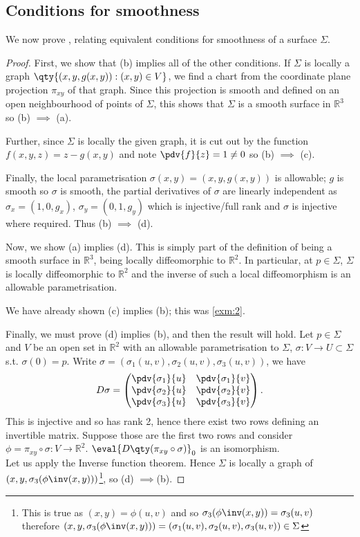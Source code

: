 \subsection{Conditions for smoothness}
We now prove , relating equivalent conditions for smoothness of a surface $\Sigma$.
\begin{proof}
	First, we show that (b) implies all of the other conditions.
	If $\Sigma$ is locally a graph $\qty{(x,y,g(x,y)) : (x, y) \in V}$, we find a chart from the coordinate plane projection $\pi_{xy}$ of that graph.
	Since this projection is smooth and defined on an open neighbourhood of points of $\Sigma$, this shows that $\Sigma$ is a smooth surface in $\mathbb R^3$ so (b) $\implies$ (a).

	Further, since $\Sigma$ is locally the given graph, it is cut out by the function $f(x,y,z) = z - g(x,y)$ and note $\pdv{f}{z} = 1 \neq 0$ so (b) $\implies$ (c).

	Finally, the local parametrisation $\sigma(x,y) = (x,y,g(x,y))$ is allowable; $g$ is smooth so $\sigma$ is smooth, the partial derivatives of $\sigma$ are linearly independent as $\sigma_x = (1, 0, g_x)$, $\sigma_y = (0, 1, g_y)$ which is injective/full rank and $\sigma$ is injective where required.
	Thus (b) $\implies$ (d).

	Now, we show (a) implies (d).
	This is simply part of the definition of being a smooth surface in $\mathbb R^3$, being locally diffeomorphic to $\mathbb R^2$.
	In particular, at $p \in \Sigma$, $\Sigma$ is locally diffeomorphic to $\mathbb R^2$ and the inverse of such a local diffeomorphism is an allowable parametrisation.

	We have already shown (c) implies (b); this was \cref{exm:2}.

	Finally, we must prove (d) implies (b), and then the result will hold.
	Let $p \in \Sigma$ and $V$ be an open set in $\mathbb R^2$ with an allowable parametrisation to $\Sigma$, $\sigma : V \to U \subset \Sigma$ s.t. $\sigma(0) = p$.
	Write $\sigma = (\sigma_1(u,v), \sigma_2(u,v), \sigma_3(u,v))$, we have
	\begin{align*}
		D\sigma = \begin{pmatrix}
			\pdv{\sigma_1}{u} & \pdv{\sigma_1}{v} \\
			\pdv{\sigma_2}{u} & \pdv{\sigma_2}{v} \\
			\pdv{\sigma_3}{u} & \pdv{\sigma_3}{v}
		\end{pmatrix}.
	\end{align*}
	This is injective and so has rank 2, hence there exist two rows defining an invertible matrix.
	Suppose those are the first two rows and consider $\phi = \pi_{xy} \circ \sigma \colon V \to \mathbb R^2$.
	$\eval{D\qty(\pi_{xy} \circ \sigma)}_0$ is an isomorphism. \\
	Let us apply the Inverse function theorem.
	Hence $\Sigma$ is locally a graph of $(x, y, \sigma_3(\phi\inv(x, y)))$\footnote{This is true as $(x, y) = \phi(u, v)$ and so $\sigma_3(\phi\inv(x, y)) = \sigma_3(u, v)$ therefore $(x, y, \sigma_3(\phi\inv(x, y))) = (\sigma_1(u,v), \sigma_2(u,v), \sigma_3(u,v)) \in \Sigma$}, so (d) $\implies$(b).
\end{proof}

